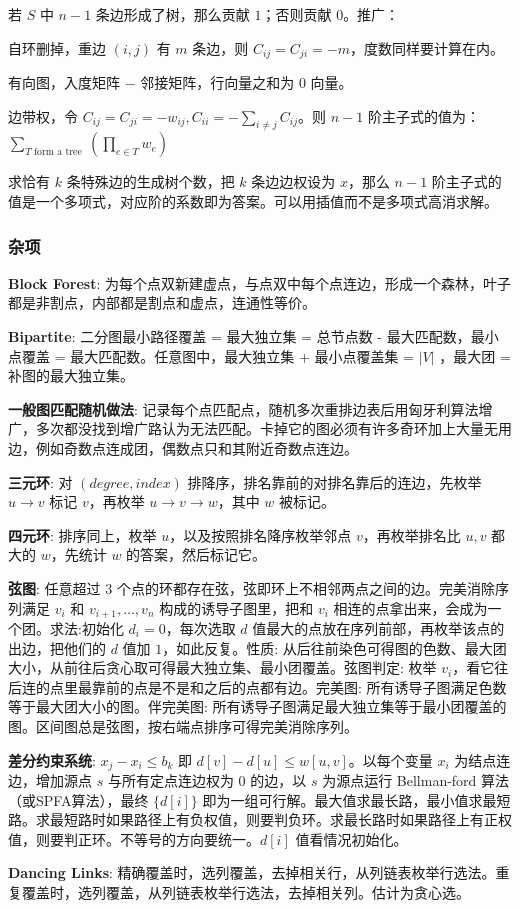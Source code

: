 若 $S$ 中 $n-1$ 条边形成了树，那么贡献 $1$；否则贡献 $0$。推广：

自环删掉，重边 $(i,j)$ 有 $m$ 条边，则 $C_{ij}=C_{ji}=-m$，度数同样要计算在内。

有向图，入度矩阵 $-$ 邻接矩阵，行向量之和为 $0$ 向量。

边带权，令 $C_{ij}=C_{ji}=-w_{ij},C_{ii}=-\sum_{i\neq j}C_{ij}$。则 $n-1$ 阶主子式的值为：$\sum_{T\text{ form a tree }}\left(\prod_{e\in T}w_e\right)$

求恰有 $k$ 条特殊边的生成树个数，把 $k$ 条边边权设为 $x$，那么 $n-1$ 阶主子式的值是一个多项式，对应阶的系数即为答案。可以用插值而不是多项式高消求解。

\subsubsection{杂项}

\textbf{Block Forest}: 为每个点双新建虚点，与点双中每个点连边，形成一个森林，叶子都是非割点，内部都是割点和虚点，连通性等价。

\textbf{Bipartite}: 二分图最小路径覆盖 = 最大独立集 = 总节点数 - 最大匹配数，最小点覆盖 = 最大匹配数。任意图中，最大独立集 + 最小点覆盖集 = $|V|$ ，最大团 = 补图的最大独立集。

\textbf{一般图匹配随机做法}: 记录每个点匹配点，随机多次重排边表后用匈牙利算法增广，多次都没找到增广路认为无法匹配。卡掉它的图必须有许多奇环加上大量无用边，例如奇数点连成团，偶数点只和其附近奇数点连边。

\textbf{三元环}: 对 $(degree, index)$ 排降序，排名靠前的对排名靠后的连边，先枚举 $u\rightarrow v$ 标记 $v$，再枚举 $u\rightarrow v\rightarrow w$，其中 $w$ 被标记。

\textbf{四元环}: 排序同上，枚举 $u$，以及按照排名降序枚举邻点 $v$，再枚举排名比 $u,v$ 都大的 $w$，先统计 $w$ 的答案，然后标记它。

\textbf{弦图}: 任意超过 $3$ 个点的环都存在弦，弦即环上不相邻两点之间的边。完美消除序列满足 $v_i$ 和 $v_{i+1},\dots,v_n$ 构成的诱导子图里，把和 $v_i$ 相连的点拿出来，会成为一个团。求法:初始化 $d_i = 0$，每次选取 $d$ 值最大的点放在序列前部，再枚举该点的出边，把他们的 $d$ 值加 $1$，如此反复。性质: 从后往前染色可得图的色数、最大团大小，从前往后贪心取可得最大独立集、最小团覆盖。弦图判定: 枚举 $v_i$，看它往后连的点里最靠前的点是不是和之后的点都有边。完美图: 所有诱导子图满足色数等于最大团大小的图。伴完美图: 所有诱导子图满足最大独立集等于最小团覆盖的图。区间图总是弦图，按右端点排序可得完美消除序列。

\textbf{差分约束系统}: $x_j − x_i\le b_k$ 即 $d[v] − d[u] \le w[u, v]$。以每个变量 $x_i$ 为结点连边，增加源点 $s$ 与所有定点连边权为 $0$ 的边，以 $s$ 为源点运行 Bellman-ford 算法（或SPFA算法），最终 $\{d[i]\}$ 即为一组可行解。最大值求最长路，最小值求最短路。求最短路时如果路径上有负权值，则要判负环。求最长路时如果路径上有正权值，则要判正环。不等号的方向要统一。$d[i]$ 值看情况初始化。

\textbf{Dancing Links}: 精确覆盖时，选列覆盖，去掉相关行，从列链表枚举行选法。重复覆盖时，选列覆盖，从列链表枚举行选法，去掉相关列。估计为贪心选。